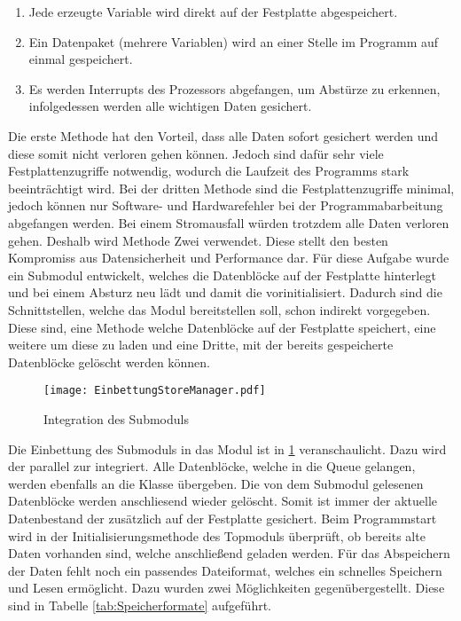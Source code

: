 \begin{enumerate}
\item Jede erzeugte Variable wird direkt auf der Festplatte abgespeichert.
\item Ein Datenpaket (mehrere Variablen) wird an einer Stelle im Programm auf
einmal gespeichert.
\item Es werden Interrupts des Prozessors abgefangen, um Abst{\"u}rze zu erkennen,
infolgedessen werden alle wichtigen Daten gesichert.
\end{enumerate}

Die erste Methode hat den Vorteil, dass alle Daten sofort gesichert werden und
diese somit nicht verloren gehen k{\"o}nnen. Jedoch sind daf{\"u}r sehr viele
Festplattenzugriffe notwendig, wodurch die Laufzeit des Programms stark
beeintr{\"a}chtigt wird. Bei der dritten Methode sind die Festplattenzugriffe
minimal, jedoch k{\"o}nnen nur Software- und Hardwarefehler bei der
Programmabarbeitung abgefangen werden. Bei einem Stromausfall w{\"u}rden
trotzdem alle Daten verloren gehen. Deshalb wird Methode Zwei verwendet. Diese
stellt den besten Kompromiss aus Datensicherheit und Performance dar. \newline
F{\"u}r diese Aufgabe wurde ein Submodul entwickelt, welches die Datenbl{\"o}cke
auf der Festplatte hinterlegt und bei einem Absturz neu l{\"a}dt und damit die
 vorinitialisiert. Dadurch sind die Schnittstellen,
welche das Modul bereitstellen soll, schon indirekt vorgegeben. Diese sind, eine
Methode welche Datenbl{\"o}cke auf der Festplatte speichert, eine weitere um
diese zu laden und eine Dritte, mit der bereits gespeicherte Datenbl{\"o}cke
gel{\"o}scht werden k{\"o}nnen.

\begin{figure}[H]
\centering
\texttt{[image: EinbettungStoreManager.pdf]}
\caption{Integration des Submoduls }
\label{fig:EinbettungStoreManager}
\end{figure}

Die Einbettung des Submoduls  in das Modul  ist
in \ref{fig:EinbettungStoreManager} veranschaulicht. Dazu wird der
 parallel zur  integriert. Alle
Datenbl{\"o}cke, welche in die Queue gelangen, werden ebenfalls an die
Klasse  {\"u}bergeben. Die von dem Submodul 
gelesenen Datenbl{\"o}cke werden anschliesend wieder gel{\"o}scht. Somit ist immer der
aktuelle Datenbestand der 
zus{\"a}tzlich auf der Festplatte gesichert. Beim Programmstart wird in der
Initialisierungsmethode des Topmoduls {\"u}berpr{\"u}ft, ob bereits alte Daten vorhanden
sind, welche anschlie{\ss}end geladen werden. \newline
F{\"u}r das Abspeichern der
Daten fehlt noch ein passendes Dateiformat, welches ein schnelles Speichern und
Lesen erm{\"o}glicht. Dazu wurden zwei M{\"o}glichkeiten gegen{\"u}bergestellt. Diese sind
in Tabelle \ref{tab:Speicherformate} aufgef{\"u}hrt.

